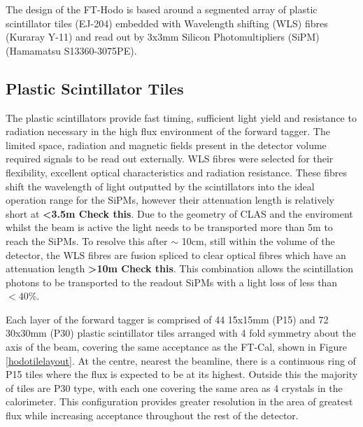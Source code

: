 The design of the FT-Hodo is based around a segmented array of plastic scintillator tiles (EJ-204) embedded with Wavelength shifting (WLS) fibres (Kuraray Y-11) and read out by 3x3mm Silicon Photomultipliers (SiPM) (Hamamatsu S13360-3075PE). 


\subsection{Plastic Scintillator Tiles}
The plastic scintillators provide fast timing, sufficient light yield and resistance to radiation necessary in the high flux environment of the forward tagger. The limited space, radiation and magnetic fields present in the detector volume required signals to be read out externally. WLS fibres were selected for their flexibility, excellent optical characteristics and radiation resistance. These fibres shift the wavelength of light outputted by the scintillators into the ideal operation range for the SiPMs, however their attenuation length is relatively short at \textbf{<3.5m Check this}. Due to the geometry of CLAS and the enviroment whilst the beam is active the light needs to be transported more than 5m to reach the SiPMs. To resolve this after $\sim$ 10cm, still within the volume of the detector, the WLS fibres are fusion spliced to clear optical fibres which have an attenuation length \textbf{>10m Check this}. This combination allows the scintillation photons to be transported to the readout SiPMs with a light loss of less than $<40\%$. \cite{FTTDR2012}

Each layer of the forward tagger is comprised of 44 15x15mm (P15) and 72 30x30mm (P30) plastic scintillator tiles arranged with 4 fold symmetry about the axis of the beam, covering the same acceptance as the FT-Cal, shown in Figure \ref{hodotilelayout}. At the centre, nearest the beamline, there is a continuous ring of P15 tiles where the flux is expected to be at its highest. Outside this the majority of tiles are P30 type, with each one covering the same area as 4 crystals in the calorimeter. This configuration provides greater resolution in the area of greatest flux while increasing acceptance throughout the rest of the detector. 

